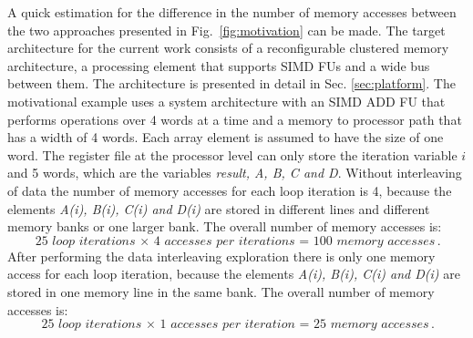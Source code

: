 \documentclass[prodmode,acmtecs]{acmsmall}
\begin{document}
A quick estimation for the difference in the number of memory accesses between the two approaches presented in Fig.~\ref{fig:motivation} can be made.
The target architecture for the current work consists of a reconfigurable clustered memory architecture, a processing element that supports SIMD FUs and a wide bus between them.
The architecture is presented in detail in Sec. \ref{sec:platform}.
The motivational example uses a system architecture with an SIMD ADD FU that performs operations over 4 words at a time and a memory to processor path that has a width of 4 words. 
Each array element is assumed to have the size of one word.
The register file at the processor level can only store the iteration variable $i$ and 5 words, which are the variables \textit{result, A, B, C and D}.
Without interleaving of data the number of memory accesses for each loop iteration is 4, because the elements \textit{A(i), B(i), C(i) and D(i)} are stored in different lines and different memory banks or one larger bank.
The overall number of memory accesses is:
	\begin{equation}
		\textit{25 loop iterations $\times$ 4 accesses per iterations = 100 memory accesses}.
	\end{equation}	 
After performing the data interleaving exploration there is only one memory access for each loop iteration, because the elements \textit{A(i), B(i), C(i) and D(i)} are stored in one memory line in the same bank.
The overall number of memory accesses is:
	\begin{equation}
		\textit{25 loop iterations $\times$ 1 accesses per iteration = 25 memory accesses}.
	\end{equation}	 	
\end{document}
